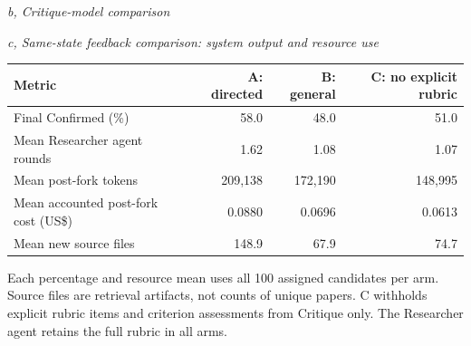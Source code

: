\begin{samepage}
\begin{center}
\vspace{5pt}
\begin{minipage}{\linewidth}
\centering
\textit{b, Critique-model comparison}\\[2pt]
\end{minipage}
\vspace{5pt}

\textit{c, Same-state feedback comparison: system output and resource use}\\[2pt]
\begin{tabular}{lrrr}
\toprule
Metric & A: directed & B: general & C: no explicit rubric\\
\midrule
Final Confirmed (\%) & 58.0 & 48.0 & 51.0\\
Mean Researcher agent rounds & 1.62 & 1.08 & 1.07\\
Mean post-fork tokens & 209,138 & 172,190 & 148,995\\
Mean accounted post-fork cost (US\$) & 0.0880 & 0.0696 & 0.0613\\
Mean new source files & 148.9 & 67.9 & 74.7\\
\bottomrule
\end{tabular}

\parbox{\linewidth}{\scriptsize Each percentage and resource mean uses all 100 assigned candidates per arm. Source files are retrieval artifacts, not counts of unique papers. C withholds explicit rubric items and criterion assessments from Critique only. The Researcher agent retains the full rubric in all arms.}
\end{center}
\end{samepage}
